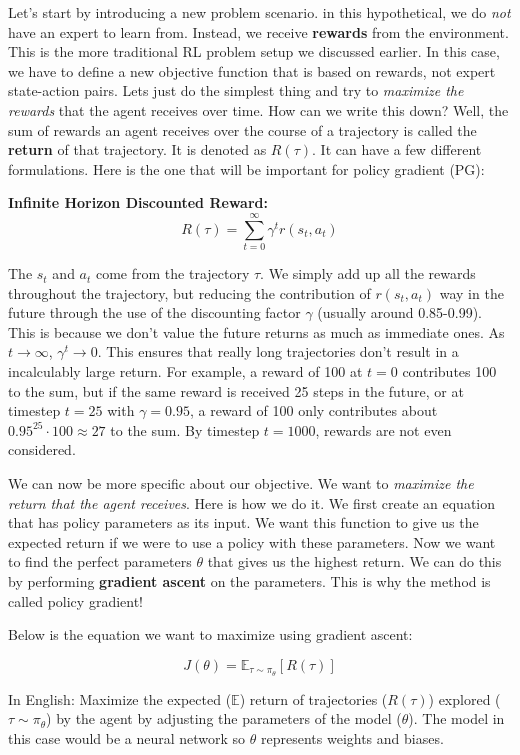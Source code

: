     \large Let's start by introducing a new problem scenario. in this hypothetical, we do \textit{not} have an expert to learn from. Instead, we receive \textbf{rewards} from the environment. This is the more traditional RL problem setup we discussed earlier. In this case, we have to define a new objective function that is based on rewards, not expert state-action pairs. Lets just do the simplest thing and try to \textit{maximize the rewards} that the agent receives over time. How can we write this down? Well, the sum of rewards an agent receives over the course of a trajectory is called the \textbf{return} of that trajectory. It is denoted as $R(\tau)$. It can have a few different formulations. Here is the one that will be important for policy gradient (PG): 

    \textbf{Infinite Horizon Discounted Reward:}
    $$R(\tau) = \sum_{t=0}^\infty \gamma^t r(s_t, a_t)$$

    The $s_t$ and $a_t$ come from the trajectory $\tau$. We simply add up all the rewards throughout the trajectory, but reducing the contribution of $r(s_t,a_t)$ way in the future through the use of the discounting factor $\gamma$ (usually around 0.85-0.99). This is because we don't value the future returns as much as immediate ones. As $t \rightarrow \infty$, $\gamma^t \rightarrow 0$. This ensures that really long trajectories don't result in a incalculably large return. For example, a reward of 100 at $t = 0$ contributes 100 to the sum, but if the same reward is received 25 steps in the future, or at timestep $t = 25$ with $\gamma = 0.95$, a reward of 100 only contributes about $0.95^{25}\cdot100 \approx 27$ to the sum. By timestep $t = 1000$, rewards are not even considered. 

    We can now be more specific about our objective. We want to \textit{maximize the return that the agent receives}. Here is how we do it. We first create an equation that has policy parameters as its input. We want this function to give us the expected return if we were to use a policy with these parameters. Now we want to find the perfect parameters $\theta$ that gives us the highest return. We can do this by performing \textbf{gradient ascent} on the parameters. This is why the method is called policy gradient! 

    Below is the equation we want to maximize using gradient ascent:

    $$J(\theta) = \mathbb{E}_{\tau \sim \pi_\theta} [R(\tau)]$$

    In English: Maximize the expected ($\mathbb{E}$) return of trajectories ($R(\tau)$) explored ($\tau \sim \pi_\theta$) by the agent by adjusting the parameters of the model ($\theta$). The model in this case would be a neural network so $\theta$ represents weights and biases. 
    
